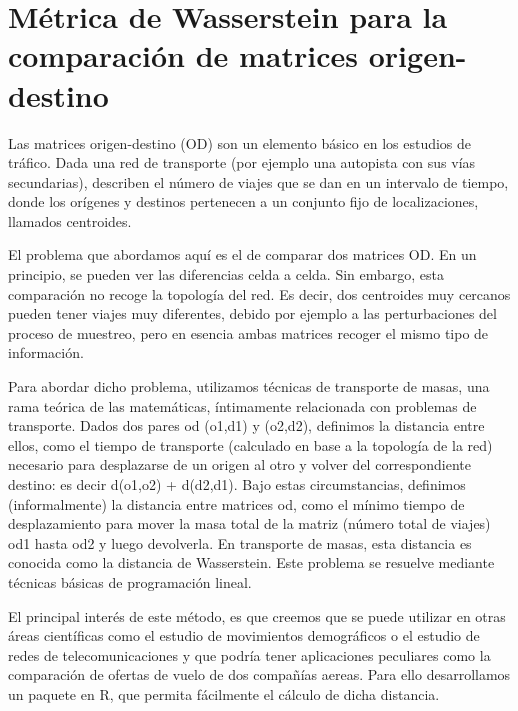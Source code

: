 \chapter{Métrica de Wasserstein para la comparación de matrices origen-destino}




Las matrices origen-destino (OD) son un elemento básico en los estudios de tráfico. Dada una red de transporte (por ejemplo una autopista con sus vías secundarias), describen el número de viajes que se dan en un intervalo de tiempo, donde los orígenes y destinos pertenecen a un conjunto fijo de localizaciones, llamados centroides.

El problema que abordamos aquí es el de comparar dos matrices OD. En un principio, se pueden ver las diferencias celda a celda. Sin embargo, esta comparación no recoge la topología del red. Es decir, dos centroides muy cercanos pueden tener viajes muy diferentes, debido por ejemplo a las perturbaciones del proceso de muestreo, pero en esencia ambas matrices recoger el mismo tipo de información.

Para abordar dicho problema, utilizamos técnicas de transporte de masas, una rama teórica de las matemáticas, íntimamente relacionada con problemas de transporte. Dados dos pares od (o1,d1) y (o2,d2), definimos la distancia entre ellos, como el tiempo de transporte (calculado en base a la topología de la red) necesario para desplazarse de un origen al otro y volver del correspondiente destino: es decir d(o1,o2) + d(d2,d1). Bajo estas circumstancias, definimos (informalmente) la distancia entre matrices od, como el mínimo tiempo de desplazamiento para mover la masa total de la matriz (número total de viajes) od1 hasta od2 y luego devolverla. En transporte de masas, esta distancia es conocida como la distancia de Wasserstein. Este problema se resuelve mediante técnicas básicas de programación lineal.

El principal interés de este método, es que creemos que se puede utilizar en otras áreas científicas como el estudio de movimientos demográficos o el estudio de redes de telecomunicaciones y que podría tener aplicaciones peculiares como la comparación de ofertas de vuelo de dos compañías aereas. Para ello desarrollamos un paquete en R, que permita fácilmente el cálculo de dicha distancia.

%

%
